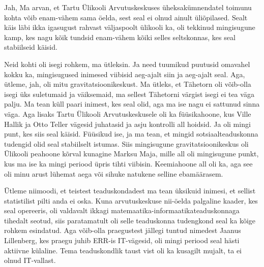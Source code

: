 
Jah, Ma arvan, et Tartu Ülikooli Arvutuskeskuses üheksakümnendatel toimunu 
kohta võib enam-vähem sama öelda, sest seal ei olnud ainult üliõpilased. Sealt 
käis läbi ikka igasugust rahvast väljaspoolt ülikooli ka,  oli tekkinud 
mingisugune  kamp, kes nagu kõik tundsid enam-vähem kõiki selles 
seltskonnas, kes seal stabiilseid käisid. 


Neid kohti oli isegi rohkem, ma ütleksin. Ja need tuumikud  puutusid omavahel 
kokku ka, mingisugused inimesed viibisid aeg-ajalt siin ja aeg-ajalt seal. Aga, 
ütleme, jah, oli mitu gravitatsioonikeskust. Ma ütleks, et Tähetorn oli 
võib-olla  isegi üks  suletumaid ja väiksemaid, ma sellest Tähetorni värgist 
isegi ei tea väga palju. Ma tean küll paari inimest, kes seal olid, aga ma ise 
nagu ei sattunud sinna väga. Aga lisaks  Tartu Ülikooli 
Arvutuskeskusele oli ka 
füüsikahoone, kus Ville 
Hallik ja Otto Teller 
vägesid juhatasid ja  asju kontrolli all hoidsid. Ja oli  mingi punt, kes siis 
seal käisid. Füüsikud ise, ja ma tean, et mingid sotsiaalteaduskonna 
tudengid olid seal stabiilselt istumas. Siis  mingisugune 
gravitatsioonikeskus oli Ülikooli peahoone kõrval kunagine Marksu 
Maja, mille all oli mingisugune punkt, kus ma 
ise ka mingi periood üpris tihti viibisin. Keemiahoone all oli ka, aga see oli minu arust  lühemat aega või 
sihuke natukene selline ebamäärasem. 


Ütleme niimoodi, et teistest teaduskondadest ma tean üksikuid inimesi, et 
sellist statistilist pilti anda ei oska. Kuna arvutuskeskuse  nii-öelda 
palgaline kaader, kes seal opereeris, oli valdavalt ikkagi  
matemaatika-informaatikateaduskonnaga tihedalt seotud, siis paratamatult oli 
selle teaduskonna tudengkond seal ka kõige rohkem esindatud. Aga võib-olla 
praegustest jällegi tuntud nimedest  Jaanus Lillenberg, kes praegu juhib ERR-is IT-vägesid, oli mingi periood seal hästi 
aktiivne külaline. Tema teaduskondlik taust vist oli 
ka kusagilt mujalt, ta ei olnud IT-vallast. 

